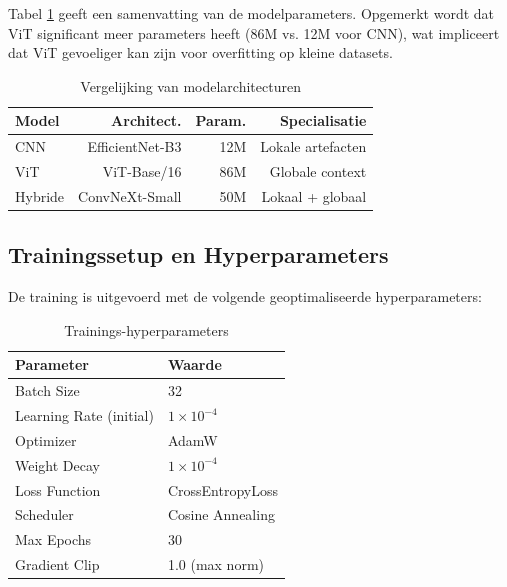 \begin{listing}[H]
    \inputminted[fontsize=\footnotesize, linenos, frame=lines]{python}{code/build_model.py}
    \caption{Python script voor de dynamische modelconstructie.}
    \label{lst:build_model}
\end{listing}

Tabel \ref{tab:model_comparison} geeft een samenvatting van de modelparameters. Opgemerkt wordt dat ViT significant meer parameters heeft (86M vs. 12M voor CNN), wat impliceert dat ViT gevoeliger kan zijn voor overfitting op kleine datasets.

\begin{table}[h]
\centering
\caption{Vergelijking van modelarchitecturen}
\label{tab:model_comparison}
\begin{tabular}{l|r|r|r}
\textbf{Model} & \textbf{Architect.} & \textbf{Param.} & \textbf{Specialisatie} \\
\hline
CNN & EfficientNet-B3 & 12M & Lokale artefacten \\
ViT & ViT-Base/16 & 86M & Globale context \\
Hybride & ConvNeXt-Small & 50M & Lokaal + globaal \\
\end{tabular}
\end{table}

\subsection{Trainingssetup en Hyperparameters}

De training is uitgevoerd met de volgende geoptimaliseerde hyperparameters:

\begin{table}[h]
\centering
\caption{Trainings-hyperparameters}
\label{tab:hyperparams}
\begin{tabular}{l|l}
\textbf{Parameter} & \textbf{Waarde} \\
\hline
Batch Size & 32 \\
Learning Rate (initial) & $1 \times 10^{-4}$ \\
Optimizer & AdamW \\
Weight Decay & $1 \times 10^{-4}$ \\
Loss Function & CrossEntropyLoss \\
Scheduler & Cosine Annealing \\
Max Epochs & 30 \\
Gradient Clip & 1.0 (max norm) \\
\end{tabular}
\end{table}

